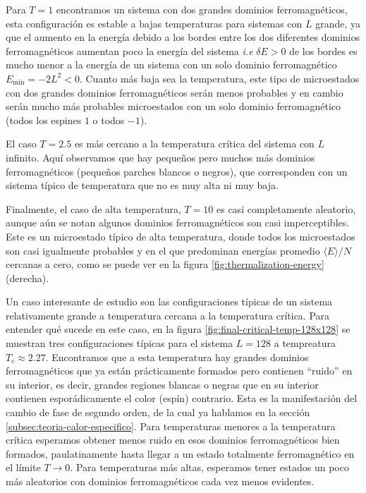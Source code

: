 \documentclass[%
 reprint,
 amsmath,amssymb,
 aps,
 pra,
]{revtex4-2}
\begin{document}
	Para $T=1$ encontramos un sistema con dos grandes dominios ferromagnéticos, esta configuración es estable a bajas temperaturas para sistemas con $L$ grande, ya que el aumento en la energía debido a los bordes entre los dos diferentes dominios ferromagnéticos aumentan poco la energía del sistema \textit{i.e} $\delta E>0$ de los bordes es mucho menor a la energía de un sistema con un solo dominio ferromagnético $E_\mathrm{min}=-2L^2<0$. Cuanto más baja sea la temperatura, este tipo de microestados con dos grandes dominios ferromagnéticos serán menos probables y en cambio serán mucho más probables microestados con un solo dominio ferromagnético (todos los espines $1$ o todos $-1$).

	El caso $T=2.5$ es más cercano a la temperatura crítica del sistema con $L$ infinito. Aquí observamos que hay pequeños pero muchos más dominios ferromagnéticos (pequeños parches blancos o negros), que corresponden con un sistema típico de temperatura que no es muy alta ni muy baja.

	Finalmente, el caso de alta temperatura, $T=10$ es casi completamente aleatorio, aunque aún se notan algunos dominios ferromagnéticos son casi imperceptibles. Este es un microestado típico de alta temperatura, donde todos los microestados son casi igualmente probables y en el que predominan energías promedio $\langle E \rangle / N$ cercanas a cero, como se puede ver en la figura \ref{fig:thermalization-energy} (derecha). \newline
	

	Un caso interesante de estudio son las configuraciones típicas de un sistema relativamente grande a temperatura cercana a la temperatura crítica. Para entender qué sucede en este caso, en la figura \ref{fig:final-critical-temp-128x128} se muestran tres configuraciones típicas para el sistema $L=128$ a tempreatura $T_c \approx 2.27$. Encontramos que a esta temperatura hay grandes dominios ferromagnéticos que ya están prácticamente formados pero contienen ``ruido'' en su interior, es decir, grandes regiones blancas o negras que en su interior contienen esporádicamente el color (espín) contrario. Esta es la manifestación del cambio de fase de segundo orden, de la cual ya hablamos en la sección \ref{subsec:teoria-calor-especifico}. Para temperaturas menores a la temperatura crítica esperamos obtener menos ruido en esos dominios ferromagnéticos bien formados, paulatinamente hasta llegar a un estado totalmente ferromagnético en el límite $T \rightarrow 0$. Para temperaturas más altas, esperamos tener estados un poco más aleatorios con dominios ferromagnéticos cada vez menos evidentes. 
\end{document}
